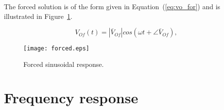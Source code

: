 The forced solution is of the form given in Equation~(\ref{eq:vo_for}) and is
illustrated in Figure~\ref{fig:forced}.

\begin{equation}
  V_{Of}(t) = |\bar{V}_{Of}| cos(\omega t + \angle \bar{V}_{Of}),
  \label{eq:vo_for}
\end{equation}

\lipsum[1-1]


\begin{figure}[h] \centering
\texttt{[image: forced.eps]}
\caption{Forced sinusoidal response.}
\label{fig:forced}
\end{figure}

\section{Frequency response}

\lipsum[1-1]


